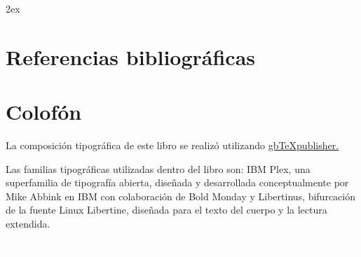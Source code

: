 \backmatter

\ifPDF
\printnoidxglossary[type=\acronymtype,title={Índice de siglas}]
\printnoidxglossary[title={Glosario de términos}]
\printbibliography[heading=none,heading=bibintoc]
\printindex[names]
\printindex[concepto]
\printindex[onomastico]
	\else
	\ifBLACKPDF
		\printnoidxglossary[type=\acronymtype,title={Índice de siglas}]
		\printnoidxglossary[title={Glosario de términos}]
		\printbibliography[heading=none,heading=bibintoc]
	\printindex[names]
	\printindex[concepto]
	\printindex[onomastico]
		\else
	 	\ifEPUB
	 	\begingroup
	 	\parindent 0pt
	 	\parskip 2ex
	 	\def\enotesize{\normalsize}
	 	\theendnotes
	 	\endgroup
	 	\printnoidxglossary[type=\acronymtype,title={Índice de siglas}]
	 	\printnoidxglossary[title={Glosario de términos}]
	 	\chapter{Referencias bibliográficas}
	 	\printbibliography[heading=none]
	 	\printindex[names]
	 	\printindex[concepto]
	 	\printindex[onomastico]
	 		\else
	 		\ifHTML
	 		\ForceHTMLPage
	 		\printnoidxglossary[title={Índice de siglas},type=\acronymtype]
	 		\ForceHTMLPage
	 		\printnoidxglossary[title={Glosario de términos}]
	 		\ForceHTMLPage
	 		\printbibliography[heading=bibintoc]
	 			\else
	 			\ifODT
	 			\printnoidxglossary[type=\acronymtype,title={Índice de siglas}]
	 			\printnoidxglossary[title={Glosario de términos}]
	 			\printbibliography[heading=none,heading=bibintoc]
	 			\fi
	 		\fi
		\fi
	\fi
\fi



\chapter{Colofón}

La composición tipográfica de este libro se realizó utilizando \href{https://github.com/albertomoyano/gbtexpublisher}{gbTeXpublisher.}

Las familias tipográficas utilizadas dentro del libro son: IBM Plex, una superfamilia de tipografía abierta, diseñada y desarrollada conceptualmente por Mike Abbink en IBM con colaboración de Bold Monday y Libertinus, bifurcación de la fuente Linux Libertine, diseñada para el texto del cuerpo y la lectura extendida.

\ifPDF
\newpage
\thispagestyle{empty}
{\textcolor{white}{.}}
	\else
	\ifBLACKPDF
	\newpage
	\thispagestyle{empty}
	{\textcolor{white}{.}}
	\fi
\fi





